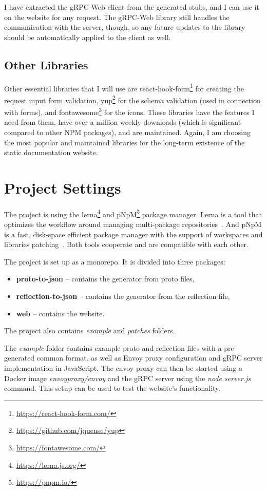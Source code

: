 I have extracted the gRPC-Web client from the generated stubs, and I can use it on the website for any request.
The gRPC-Web library still handles the communication with the server, though, so any future updates to the library should be automatically applied to the client as well.

\subsection{Other Libraries}
Other essential libraries that I will use are react-hook-form\footnote{\url{https://react-hook-form.com/}} for creating the request input form validation, yup\footnote{\url{https://github.com/jquense/yup}} for the schema validation (used in connection with forms), and fontawesome\footnote{\url{https://fontawesome.com/}} for the icons.
These libraries have the features I need from them, have over a million weekly downloads (which is significant compared to other NPM packages), and are maintained.
Again, I am choosing the most popular and maintained libraries for the long-term existence of the static documentation website.


\section{Project Settings}
The project is using the lerna\footnote{\url{https://lerna.js.org/}} and pNpM\footnote{\url{https://pnpm.io/}} package manager.
Lerna is a tool that optimizes the workflow around managing multi-package repositories~\cite{lerna}.
And pNpM is a fast, disk-space efficient package manager with the support of workspaces and libraries patching~\cite{pnpm}.
Both tools cooperate and are compatible with each other.

The project is set up as a monorepo.
It is divided into three packages:
\begin{itemize}
    \item \textbf{proto-to-json} -- contains the generator from proto files,
    \item \textbf{reflection-to-json} -- contains the generator from the reflection file,
    \item \textbf{web} -- contains the website.
\end{itemize}
The project also contains \textit{example} and \textit{patches} folders.

The \textit{example} folder contains example proto and reflection files with a pre-generated common format, as well as Envoy proxy configuration and gRPC server implementation in JavaScript.
The envoy proxy can then be started using a Docker image \textit{envoyproxy/envoy} and the gRPC server using the \textit{node server.js} command.
This setup can be used to test the website's functionality.

